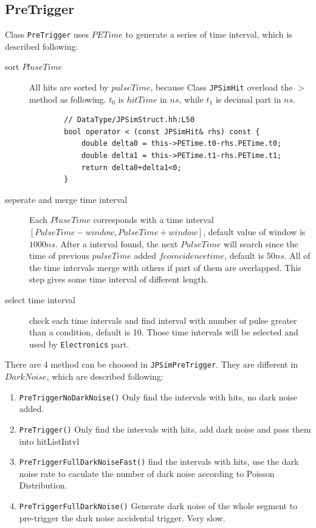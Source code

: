 \subsection{PreTrigger}
Class \texttt{PreTrigger} uses $PETime$ to generate a series of time interval, which is described following:
\begin{description}
    \item[sort $PluseTime$] All hits are sorted by $pulseTime$, because Class \texttt{JPSimHit} overload the $>$ method as following. $t_0$ is $hitTime$ in $ns$,
    while $t_1$ is decimal part in $ns$.
    \begin{lstlisting}
        // DataType/JPSimStruct.hh:L50
        bool operator < (const JPSimHit& rhs) const { 
            double delta0 = this->PETime.t0-rhs.PETime.t0;
            double delta1 = this->PETime.t1-rhs.PETime.t1;
            return delta0+delta1<0; 
        }
    \end{lstlisting}
    \item[seperate and merge time interval] 
    Each $PluseTime$ corresponds with a time interval $[PulseTime-window, PulseTime+window]$, default value of window is $1000ns$.
    After a interval found, the next $PulseTime$ will search since the time of previous $pulseTime$ added $fcoincidence time$, default is $50ns$.
    All of the time intervals merge with others if part of them are overlapped. This step gives some time interval of different 
    length.
    \item[select time interval] check each time intervals and find interval with number of pulse greater than a condition, default is 10.
    Those time intervals will be selected and used by \texttt{Electronics} part.
\end{description}
There are 4 method can be choosed in \texttt{JPSimPreTrigger}. They are different in $DarkNoise$, which are described following:
\begin{enumerate}
    \item \texttt{PreTriggerNoDarkNoise()} Only find the intervals with hits, no dark noise added.
    \item \texttt{PreTrigger()} Only find the intervals with hits, add dark noise and pass them into hitListIntvl
    \item \texttt{PreTriggerFullDarkNoiseFast()} find the intervals with hits, use the dark noise rate to caculate the number of dark noise according to Poisson Distribution.
    \item \texttt{PreTriggerFullDarkNoise()} Generate dark noise of the whole segment to pre-trigger the dark noise accidental trigger. Very slow.
\end{enumerate}
